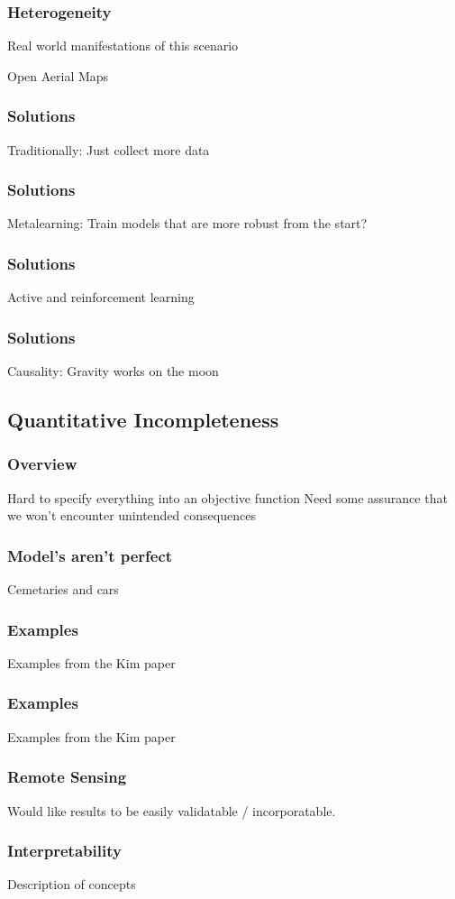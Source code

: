 \documentclass[10pt,mathserif]{beamer}
\begin{document}
\begin{frame}
  \frametitle{Heterogeneity}
  Real world manifestations of this scenario

  Open Aerial Maps
\end{frame}

\begin{frame}[]
  \frametitle{Solutions}
  Traditionally: Just collect more data
\end{frame}

\begin{frame}[]
  \frametitle{Solutions}
  Metalearning: Train models that are more robust from the start?
\end{frame}

\begin{frame}[]
  \frametitle{Solutions}
  Active and reinforcement learning
\end{frame}

\begin{frame}[]
  \frametitle{Solutions}
  Causality: Gravity works on the moon
\end{frame}

\subsection{Quantitative Incompleteness}
\label{subsec:label}

\begin{frame}
  \frametitle{Overview}
  Hard to specify everything into an objective function
  Need some assurance that we won't encounter unintended consequences
\end{frame}

\begin{frame}
  \frametitle{Model's aren't perfect}
 Cemetaries and cars 
\end{frame}

\begin{frame}
  \frametitle{Examples}
  Examples from the Kim paper
\end{frame}

\begin{frame}
  \frametitle{Examples}
  Examples from the Kim paper
\end{frame}

\begin{frame}
  \frametitle{Remote Sensing}
  Would like results to be easily validatable / incorporatable.
\end{frame}

\begin{frame}
  \frametitle{Interpretability}
  Description of concepts
\end{frame}
\end{document}
